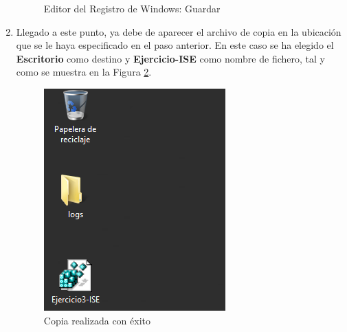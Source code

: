 \begin{enumerate}
\begin{figure}[H]
				\caption{Editor del Registro de Windows: Guardar} 
				\label{fig:figura3-4}
			\end{figure}
		\vspace{-15pt}
		\item Llegado a este punto, ya debe de aparecer el archivo de copia en la ubicación que se le haya especificado en el paso anterior. En este caso se ha elegido el \textbf{Escritorio} como destino y \textbf{Ejercicio-ISE} como nombre de fichero, tal y como se muestra en la Figura \ref{fig:figura3-5}.
			\begin{figure}[H] %
				\centering
				\includegraphics[scale=0.8]{figuras/ejercicio3/figura3-5.png} 
				\caption{Copia realizada con éxito} 
				\label{fig:figura3-5}
			\end{figure}
	\end{enumerate}

